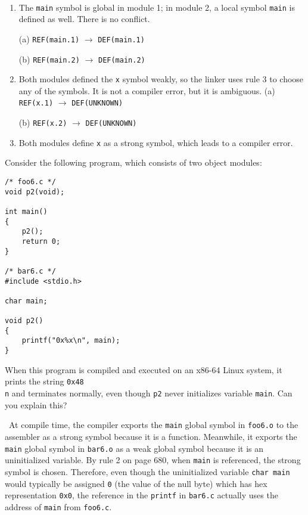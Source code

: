 \documentclass[12pt]{article}
\newenvironment{ex}[2][Exercise]{\begin{trivlist}
		\item[\hskip \labelsep {\bfseries #1}\hskip \labelsep {\bfseries #2.}]}{\end{trivlist}}
\newenvironment{sol}[1][Solution]{\begin{trivlist}
		\item[\hskip \labelsep {\bfseries #1:}]}{\end{trivlist}}
\begin{document}
\begin{sol}
	\
	\begin{enumerate}[label=(\alph*)]
		\item The \texttt{main} symbol is global in module 1; in module 2, a local symbol \texttt{main}
		is defined as well. There is no conflict.
		
		(a) \texttt{REF(main.1)} $\to$ \texttt{DEF(main.1)}
		
		(b) \texttt{REF(main.2)} $\to$ \texttt{DEF(main.2)}
		
		\item Both modules defined the \texttt{x} symbol weakly, so the linker uses rule 3 to choose any of
		the symbols. It is not a compiler error, but it is ambiguous.
		(a) \texttt{REF(x.1)} $\to$ \texttt{DEF(UNKNOWN)}
		
		(b) \texttt{REF(x.2)} $\to$ \texttt{DEF(UNKNOWN)}
		
		\item Both modules define \texttt{x} as a strong symbol, which leads to a compiler error.
	\end{enumerate}
\end{sol}

\begin{ex}{7.9}
	Consider the following program, which consists of two object modules:
	\begin{lstlisting}
/* foo6.c */
void p2(void);

int main()
{
	p2();
	return 0;
}

/* bar6.c */
#include <stdio.h>

char main;

void p2()
{
	printf("0x%x\n", main);
}
	\end{lstlisting}
	When this program is compiled and executed on an x86-64 Linux system, it prints the string
	\texttt{0x48\\n} and terminates normally, even though \texttt{p2} never initializes variable
	\texttt{main}. Can you explain this?
\end{ex}

\begin{sol}
	\
	At compile time, the compiler exports the \texttt{main} global symbol in \texttt{foo6.o} to the assembler
	as a strong symbol because it is a function. Meanwhile, it exports the \texttt{main} global symbol
	in \texttt{bar6.o} as a weak global symbol because it is an uninitialized variable. By rule 2 on
	page 680, when \texttt{main} is referenced, the strong symbol is chosen. Therefore, even though
	the uninitialized variable \texttt{char main} would typically be assigned \texttt{0} (the value
	of the null byte) which has hex representation \texttt{0x0}, the reference in the \texttt{printf}
	in \texttt{bar6.c} actually uses the address of \texttt{main} from \texttt{foo6.c}.
\end{sol}
\end{document}

